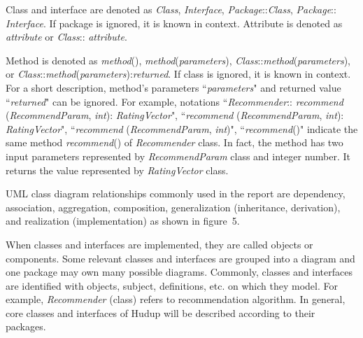 \documentclass[a4paper]{llncs}
\begin{document}
Class and interface are denoted as \textit{Class}, \textit{Interface}, \textit{Package}::\textit{Class}, \textit{Package}:: \textit{Interface}. If package is ignored, it is known in context. Attribute is denoted as \textit{attribute} or \textit{Class}:: \textit{attribute}.

Method is denoted as \textit{method}(), \textit{method}(\textit{parameters}), \textit{Class}::\textit{method}(\textit{parameters}), or \textit{Class}::\textit{method}(\textit{parameters}):\textit{returned}. If class is ignored, it is known in context. For a short description, method's parameters ``\textit{parameters}" and returned value ``\textit{returned}" can be ignored. For example, notations ``\textit{Recommender}:: \textit{recommend} (\textit{RecommendParam}, \textit{int}): \textit{RatingVector}", ``\textit{recommend} (\textit{RecommendParam}, \textit{int}): \textit{RatingVector}", ``\textit{recommend} (\textit{RecommendParam}, \textit{int})", ``\textit{recommend}()" indicate the same method \textit{recommend}() of \textit{Recommender} class. In fact, the method has two input parameters represented by \textit{RecommendParam} class and integer number. It returns the value represented by \textit{RatingVector} class.

UML class diagram relationships commonly used in the report are dependency, association, aggregation, composition, generalization (inheritance, derivation), and realization (implementation) as shown in figure~5.

When classes and interfaces are implemented, they are called objects or components. Some relevant classes and interfaces are grouped into a diagram and one package may own many possible diagrams. Commonly, classes and interfaces are identified with objects, subject, definitions, etc. on which they model. For example, \textit{Recommender} (class) refers to recommendation algorithm. In general, core classes and interfaces of Hudup will be described according to their packages.
\end{document}
